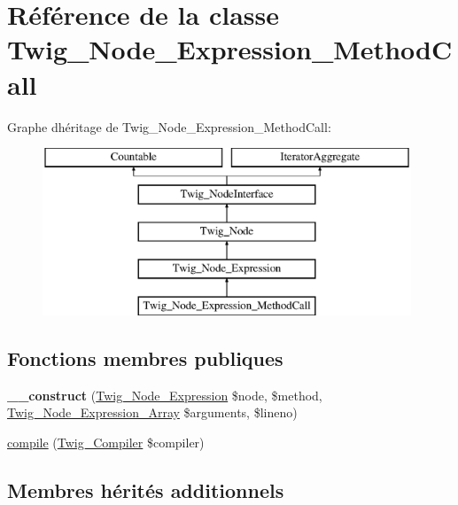 \hypertarget{class_twig___node___expression___method_call}{}\section{Référence de la classe Twig\+\_\+\+Node\+\_\+\+Expression\+\_\+\+Method\+Call}
\label{class_twig___node___expression___method_call}
Graphe d\textquotesingle{}héritage de Twig\+\_\+\+Node\+\_\+\+Expression\+\_\+\+Method\+Call\+:\begin{figure}[H]
\begin{center}
\leavevmode
\includegraphics[height=5.000000cm]{class_twig___node___expression___method_call}
\end{center}
\end{figure}
\subsection*{Fonctions membres publiques}
\begin{DoxyCompactItemize}
\item 
{\bfseries \+\_\+\+\_\+construct} (\hyperlink{class_twig___node___expression}{Twig\+\_\+\+Node\+\_\+\+Expression} \$node, \$method, \hyperlink{class_twig___node___expression___array}{Twig\+\_\+\+Node\+\_\+\+Expression\+\_\+\+Array} \$arguments, \$lineno)\hypertarget{class_twig___node___expression___method_call_aa787d6cb923f5248b7304bcc4b5bfa12}{}\label{class_twig___node___expression___method_call_aa787d6cb923f5248b7304bcc4b5bfa12}

\item 
\hyperlink{class_twig___node___expression___method_call_a4e0faa87c3fae583620b84d3607085da}{compile} (\hyperlink{class_twig___compiler}{Twig\+\_\+\+Compiler} \$compiler)
\end{DoxyCompactItemize}
\subsection*{Membres hérités additionnels}



